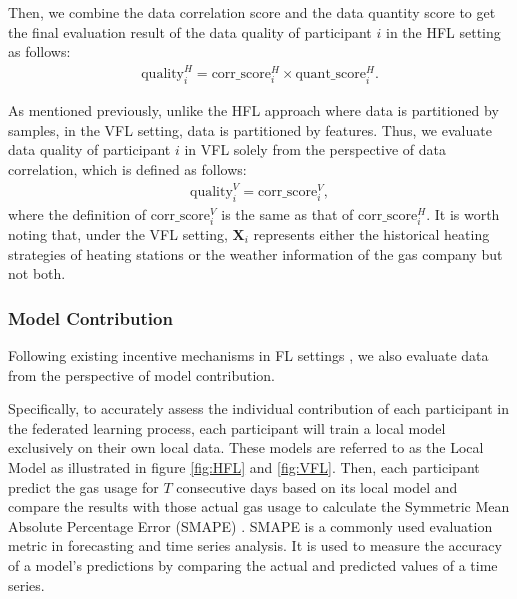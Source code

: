 \documentclass{article}
\begin{document}
Then, we combine the data correlation score and the data quantity score to get the final evaluation result of the data quality of participant $i$ in the HFL setting as follows:
\begin{equation}
\label{eq:data_quality_hfl}
\begin{aligned}
\text{quality}_i^H = \text{corr\_score}_i^H \times \text{quant\_score}_i^H. 
\end{aligned}
\end{equation}

As mentioned previously, unlike the HFL approach where data is partitioned by samples, in the VFL setting, data is partitioned by features. Thus, we evaluate data quality of participant $i$ in VFL solely from the perspective of data correlation, which is defined as follows:
\begin{equation}
\label{eq:data_quality_vfl}
\begin{aligned}
\text{quality}_i^V = \text{corr\_score}_i^V, 
\end{aligned}
\end{equation}
where the definition of $\text{corr\_score}_i^V$ is the same as that of $\text{corr\_score}_i^H$. It is worth noting that, under the VFL setting, $\mathbf{X}_i$ represents either the historical heating strategies of heating stations or the weather information of the gas company but not both.


\subsubsection{Model Contribution}
Following existing incentive mechanisms in FL settings \cite{Liu-et-al:2022IAAI}, we also evaluate data from the perspective of model contribution. 

Specifically, to accurately assess the individual contribution of each participant in the federated learning process, each participant will train a local model exclusively on their own local data. These models are referred to as the Local Model as illustrated in figure \ref{fig:HFL} and \ref{fig:VFL}. Then, each participant predict the gas usage for $T$ consecutive days based on its local model and compare the results with those actual gas usage to calculate the Symmetric Mean Absolute Percentage Error (SMAPE) \cite{hyndman2006another}. SMAPE  is a commonly used evaluation metric in forecasting and time series analysis. It is used to measure the accuracy of a model's predictions by comparing the actual and predicted values of a time series.
\end{document}
